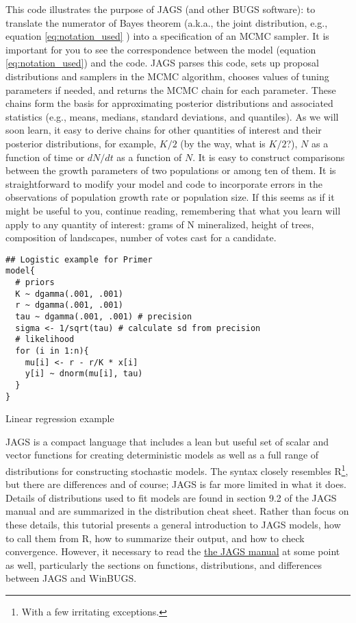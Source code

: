 \documentclass[12pt,english]{article}
\begin{document}
This code illustrates the purpose of JAGS (and other BUGS software): to translate the numerator of Bayes theorem (a.k.a., the joint distribution, e.g., equation \ref{eq:notation_used} ) into a specification of an MCMC sampler. It is important for you to see the correspondence between the model (equation \ref{eq:notation_used}) and the code. JAGS parses this code, sets up proposal distributions and samplers in the MCMC algorithm, chooses values of tuning parameters if needed, and returns the MCMC chain for each parameter. These chains form the basis for approximating posterior distributions and associated statistics (e.g., means, medians, standard deviations, and quantiles). As we will soon learn, it easy to derive chains for other quantities of interest and their posterior distributions, for example, $K/2$ (by the way, what is $K/2$?), $N$ as a function of time or $dN/dt$ as a function of $N$. It is easy to construct comparisons between the growth parameters of two populations or among ten of them. It is straightforward to modify your model and code to incorporate errors in the observations of population growth rate or population size. If this seems as if it might be useful to you, continue reading, remembering that what you learn will apply to any quantity of interest: grams of N mineralized, height of trees, composition of landscapes, number of votes cast for a candidate.

\begin{algorithm}
\begin{Verbatim}[frame=single]
## Logistic example for Primer
model{
  # priors
  K ~ dgamma(.001, .001)
  r ~ dgamma(.001, .001)
  tau ~ dgamma(.001, .001) # precision
  sigma <- 1/sqrt(tau) # calculate sd from precision
  # likelihood
  for (i in 1:n){
    mu[i] <- r - r/K * x[i]
    y[i] ~ dnorm(mu[i], tau)
  }
}
\end{Verbatim}
\caption{Linear regression example}
\label{alg:Linear regression example}
\end{algorithm}

JAGS is a compact language that includes a lean but useful set of scalar and vector functions for creating deterministic models as well as a full range of distributions for constructing stochastic models. The syntax closely resembles R\footnote{With a few irritating exceptions.}, but there are differences and of course; JAGS is far more limited in what it does. Details of distributions used to fit models are found in section 9.2 of the JAGS manual \citep{Plummer_mannual} and are summarized in the distribution cheat sheet. Rather than focus on these details, this tutorial presents a general introduction to JAGS models, how to call them from R, how to summarize their output, and how to check convergence. However, it necessary to read the \href{https://sourceforge.net/projects/mcmc-jags/files/Manuals/4.x/}{the JAGS manual} at some point as well, particularly the sections on functions, distributions, and differences between JAGS and WinBUGS.
\end{document}
